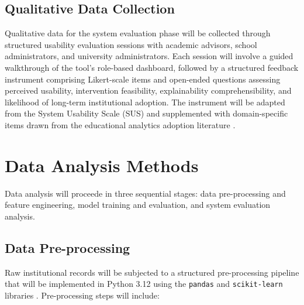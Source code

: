 \documentclass[12pt]{report}
\begin{document}
\subsection{Qualitative Data Collection}

Qualitative data for the system evaluation phase will be collected through structured
usability evaluation sessions with academic advisors, school administrators, and
university administrators. Each session will involve a guided walkthrough of the
tool's role-based dashboard, followed by a structured feedback instrument
comprising Likert-scale items and open-ended questions assessing perceived usability,
intervention feasibility, explainability comprehensibility, and likelihood of long-term
institutional adoption. The instrument will be adapted from the System Usability Scale
(SUS) \parencite{brooke1996sus} and supplemented with domain-specific items drawn from
the educational analytics adoption literature \parencite{kwakye2025,
zhang2021}.

\section{Data Analysis Methods}

Data analysis will proceede in three sequential stages: data pre-processing and feature
engineering, model training and evaluation, and system evaluation analysis.

\subsection{Data Pre-processing}

Raw institutional records will be subjected to a structured pre-processing pipeline that will be
implemented in Python 3.12 using the \texttt{pandas} and \texttt{scikit-learn}
libraries \parencite{pedregosa2011scikit}. Pre-processing steps will include:
\end{document}
